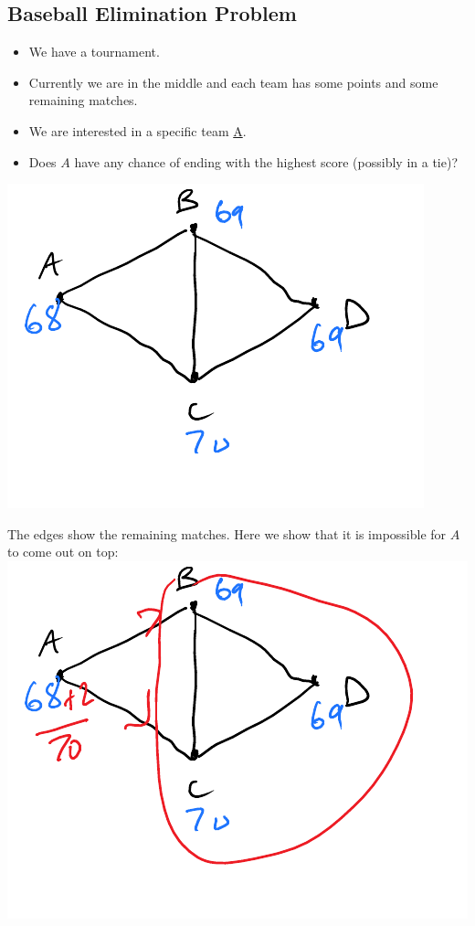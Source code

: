 \documentclass[12 pt]{article}
\begin{document}
        \subsection{Baseball Elimination Problem}
        \begin{itemize}
        \item We have a tournament.
        \item Currently we are in the middle and each team has some
          points and some remaining matches.
        \item We are interested in a specific team \underline{A}.
        \item Does $A$ have any chance of ending with the highest
          score (possibly in a tie)?
        \end{itemize}
        \includegraphics[width=.9\textwidth]{i83.pdf}

        The edges show the remaining matches. Here we show that it is
        impossible for $A$ to come out on top:
        \\ \includegraphics[width=.9\textwidth]{i84.pdf}
\end{document}
